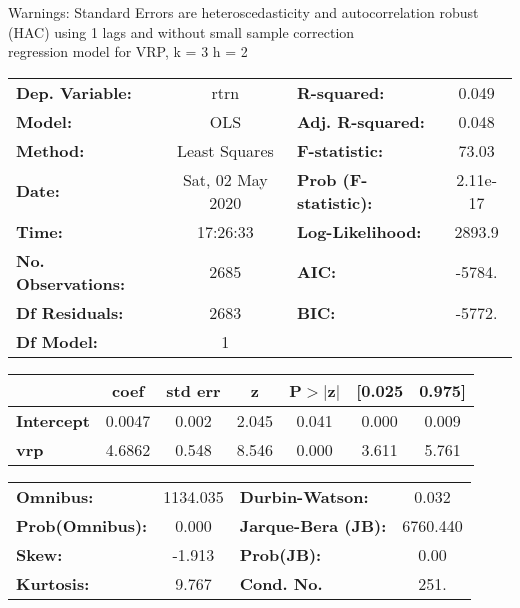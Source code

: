 Warnings: \newline
 [1] Standard Errors are heteroscedasticity and autocorrelation robust (HAC) using 1 lags and without small sample correction\\ 

regression model for VRP, k = 3 h = 2\begin{center}
\begin{tabular}{lclc}
\toprule
\textbf{Dep. Variable:}    &       rtrn       & \textbf{  R-squared:         } &     0.049   \\
\textbf{Model:}            &       OLS        & \textbf{  Adj. R-squared:    } &     0.048   \\
\textbf{Method:}           &  Least Squares   & \textbf{  F-statistic:       } &     73.03   \\
\textbf{Date:}             & Sat, 02 May 2020 & \textbf{  Prob (F-statistic):} &  2.11e-17   \\
\textbf{Time:}             &     17:26:33     & \textbf{  Log-Likelihood:    } &    2893.9   \\
\textbf{No. Observations:} &        2685      & \textbf{  AIC:               } &    -5784.   \\
\textbf{Df Residuals:}     &        2683      & \textbf{  BIC:               } &    -5772.   \\
\textbf{Df Model:}         &           1      & \textbf{                     } &             \\
\bottomrule
\end{tabular}
\begin{tabular}{lcccccc}
                   & \textbf{coef} & \textbf{std err} & \textbf{z} & \textbf{P$> |$z$|$} & \textbf{[0.025} & \textbf{0.975]}  \\
\midrule
\textbf{Intercept} &       0.0047  &        0.002     &     2.045  &         0.041        &        0.000    &        0.009     \\
\textbf{vrp}       &       4.6862  &        0.548     &     8.546  &         0.000        &        3.611    &        5.761     \\
\bottomrule
\end{tabular}
\begin{tabular}{lclc}
\textbf{Omnibus:}       & 1134.035 & \textbf{  Durbin-Watson:     } &    0.032  \\
\textbf{Prob(Omnibus):} &   0.000  & \textbf{  Jarque-Bera (JB):  } & 6760.440  \\
\textbf{Skew:}          &  -1.913  & \textbf{  Prob(JB):          } &     0.00  \\
\textbf{Kurtosis:}      &   9.767  & \textbf{  Cond. No.          } &     251.  \\
\bottomrule
\end{tabular}
\end{center}

